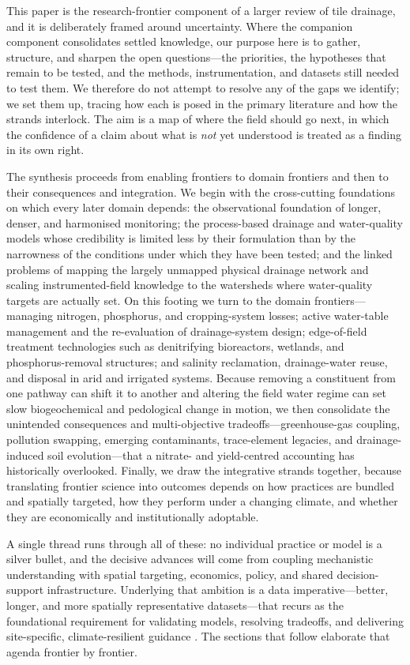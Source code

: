 This paper is the research-frontier component of a larger review of tile
drainage, and it is deliberately framed around uncertainty. Where the
companion component consolidates settled knowledge, our purpose here is to
gather, structure, and sharpen the open questions---the priorities, the
hypotheses that remain to be tested, and the methods, instrumentation, and
datasets still needed to test them. We therefore do not attempt to resolve
any of the gaps we identify; we set them up, tracing how each is posed in
the primary literature and how the strands interlock. The aim is a map of
where the field should go next, in which the confidence of a claim about
what is \emph{not} yet understood is treated as a finding in its own right.

The synthesis proceeds from enabling frontiers to domain frontiers and
then to their consequences and integration. We begin with the cross-cutting
foundations on which every later domain depends: the observational
foundation of longer, denser, and harmonised monitoring; the process-based
drainage and water-quality models whose credibility is limited less by
their formulation than by the narrowness of the conditions under which they
have been tested; and the linked problems of mapping the largely unmapped
physical drainage network and scaling instrumented-field knowledge to the
watersheds where water-quality targets are actually set. On this footing we
turn to the domain frontiers---managing nitrogen, phosphorus, and
cropping-system losses; active water-table management and the re-evaluation
of drainage-system design; edge-of-field treatment technologies such as
denitrifying bioreactors, wetlands, and phosphorus-removal structures; and
salinity reclamation, drainage-water reuse, and disposal in arid and
irrigated systems. Because removing a constituent from one pathway can
shift it to another and altering the field water regime can set slow
biogeochemical and pedological change in motion, we then consolidate the
unintended consequences and multi-objective tradeoffs---greenhouse-gas
coupling, pollution swapping, emerging contaminants, trace-element
legacies, and drainage-induced soil evolution---that a nitrate- and
yield-centred accounting has historically overlooked. Finally, we draw the
integrative strands together, because translating frontier science into
outcomes depends on how practices are bundled and spatially targeted, how
they perform under a changing climate, and whether they are economically
and institutionally adoptable.

A single thread runs through all of these: no individual practice or model
is a silver bullet, and the decisive advances will come from coupling
mechanistic understanding with spatial targeting, economics, policy, and
shared decision-support infrastructure. Underlying that ambition is a data
imperative---better, longer, and more spatially representative
datasets---that recurs as the foundational requirement for validating
models, resolving tradeoffs, and delivering site-specific, climate-resilient
guidance \parencite{Ma2025,SKAGGS1994,Deng2011}. The sections that follow
elaborate that agenda frontier by frontier.